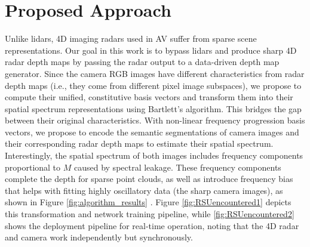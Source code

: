 \section{Proposed Approach}
Unlike lidars, 4D imaging radars used in AV suffer from sparse scene representations. Our goal in this work is to bypass lidars and produce sharp 4D radar depth maps by passing the radar output to a data-driven depth map generator. Since the camera RGB images have different characteristics from radar depth maps (i.e., they come from different pixel image subspaces), we propose to compute their unified, constitutive basis vectors and transform them into their spatial spectrum representations using Bartlett’s algorithm. This bridges the gap between their original characteristics. With non-linear frequency progression basis vectors, we propose to encode the semantic segmentations of camera images and their corresponding radar depth maps to estimate their spatial spectrum. Interestingly, the spatial spectrum of both images includes frequency components proportional to $M$ caused by spectral leakage. These frequency components complete the depth for sparse point clouds, as well as introduce frequency bias that helps with fitting highly oscillatory data (the sharp camera images), as shown in Figure \ref{fig:algorithm_results} \cite{xu2024overview}. Figure \ref{fig:RSUencountered1} depicts this transformation and network training pipeline, while \ref{fig:RSUencountered2} shows the deployment pipeline for real-time operation, noting that the 4D radar and camera work independently but synchronously.


